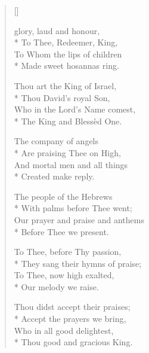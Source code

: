 \newHymn
{}

\begin{verse}[\versewidth]

 glory, laud and honour,\\*
To Thee, Redeemer, King,\\
To Whom the lips of children\\*
Made sweet hosannas ring.
\pointorig

Thou art the King of Israel,\\*
Thou David’s royal Son,\\
Who in the Lord’s Name comest,\\*
The King and Blessèd One.



The company of angels\\*
Are praising Thee on High,\\
And mortal men and all things\\*
Created make reply.



The people of the Hebrews\\*
With palms before Thee went;\\
Our prayer and praise and anthems\\*
Before Thee we present.



To Thee, before Thy passion,\\*
They sang their hymns of praise;\\
To Thee, now high exalted,\\*
Our melody we raise.



Thou didst accept their praises;\\*
Accept the prayers we bring,\\
Who in all good delightest,\\*
Thou good and gracious King.

\end{verse}

